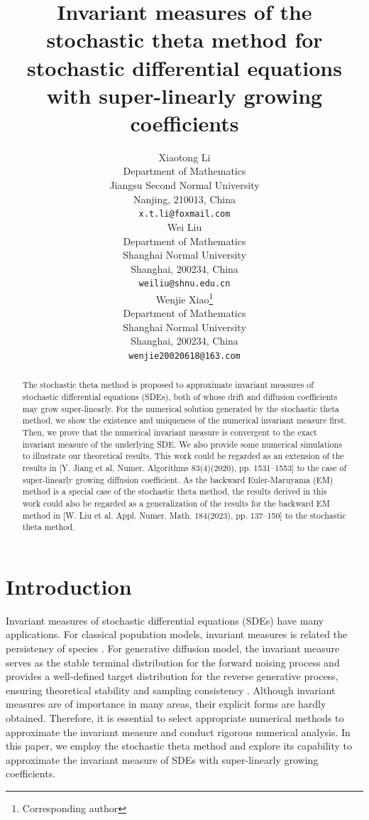 \documentclass{article}
\title{Invariant measures of the stochastic theta method for stochastic differential equations with super-linearly growing coefficients}
\author{Xiaotong Li\\
	Department of Mathematics\\
	Jiangsu Second Normal University\\
	Nanjing, 210013, China \\
	\texttt{x.t.li@foxmail.com} \\
	\And
	Wei Liu\\
	Department of Mathematics\\
	Shanghai Normal University\\
	Shanghai, 200234, China \\
	\texttt{weiliu@shnu.edu.cn} \\
	\And
	Wenjie Xiao\thanks{Corresponding author} \\
	Department of Mathematics\\
	Shanghai Normal University\\
	Shanghai, 200234, China \\
	\texttt{wenjie20020618@163.com} \\
}
\begin{document}
\maketitle

\begin{abstract}
The stochastic theta method is proposed to approximate invariant measures of stochastic differential equations (SDEs), both of whose drift and diffusion coefficients may grow super-linearly. For the numerical solution generated by the stochastic theta method, we show the existence and uniqueness of the numerical invariant measure first. Then, we prove that the numerical invariant measure is convergent to the exact invariant measure of the underlying SDE. We also provide some numerical simulations to illustrate our theoretical results. This work could be regarded as an extension of the results in [Y. Jiang et al, Numer. Algorithms 83(4)(2020), pp. 1531–1553] to the case of super-linearly growing diffusion coefficient. As the backward Euler-Maruyama (EM) method is a special case of the stochastic theta method, the results derived in this work could also be regarded as a generalization of the results for the backward EM method in [W. Liu et al. Appl. Numer. Math. 184(2023), pp. 137–150] to the stochastic theta method.
\end{abstract}



\section{Introduction}\label{sec:intro}
Invariant measures of stochastic differential equations (SDEs) have many applications. For classical population models, invariant measures is related the persistency of species \cite{Allen2007,Allen2015}. For generative diffusion model, the invariant measure serves as the stable terminal distribution for the forward noising process and provides a well‑defined target distribution for the reverse generative process, ensuring theoretical stability and sampling consistency \cite{CaoTanGaoXuChenHangLi2024,Songetal2021}. Although invariant measures are of importance in many areas, their explicit forms are hardly obtained. Therefore, it is essential to select appropriate numerical methods to approximate the invariant measure and conduct rigorous numerical analysis. In this paper, we employ the stochastic theta method and explore its capability to approximate the invariant measure of SDEs with super-linearly growing coefficients.
\end{document}
